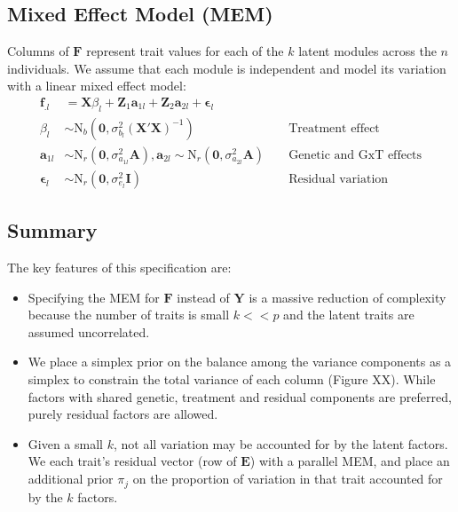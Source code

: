 \documentclass[landscape,a0paper,fontscale=0.35]{baposter}
\begin{document}
\begin{poster}
{\subsection{Mixed Effect Model (MEM)}
Columns of $\mathbf{F}$ represent trait values for each of the $k$ latent modules across the $n$ individuals. We assume that each module is independent and model its variation with a linear mixed effect model:
\begin{align}
\mathbf{f}_{.l} &= \mathbf{X} \beta_l + \mathbf{Z}_1 \mathbf{a}_{1l} + \mathbf{Z}_2 \mathbf{a}_{2l} + \mathbf{\epsilon}_l \\
\beta_l &\sim \mbox{N}_b(\mathbf{0},\sigma^2_{b_l} (\mathbf{X}'\mathbf{X})^{-1}) &&\mbox { Treatment effect} \nonumber \\
\mathbf{a}_{1l} &\sim \mbox{N}_r(\mathbf{0},\sigma^2_{a_{1l}} \mathbf{A}), \mathbf{a}_{2l} \sim \mbox{N}_r(\mathbf{0},\sigma^2_{a_{2l}} \mathbf{A}) 
	&&\mbox { Genetic and GxT effects}  \nonumber \\
\mathbf{\epsilon}_l &\sim \mbox{N}_r(\mathbf{0},\sigma^2_{e_l} \mathbf{I}) &&\mbox { Residual variation}  \nonumber
\end{align}


\subsection{Summary}
The key features of this specification are:
\begin{itemize}
\item Specifying the MEM for $\mathbf{F}$ instead of $\mathbf{Y}$ is a massive reduction of complexity because the number of traits is small $k << p$ and the latent traits are assumed uncorrelated.
\item We place a simplex prior on the balance among the variance components as a simplex to constrain the total variance of each column (Figure XX). While factors with shared genetic, treatment and residual components are preferred, purely residual factors are allowed.
\item Given a small $k$, not all variation may be accounted for by the latent factors. We each trait's residual vector (row of $\mathbf{E}$) with a parallel MEM, and place an additional prior $\pi_j$ on the proportion of variation in that trait accounted for by the $k$ factors.
\end{itemize}
}
\end{poster}
\end{document}
